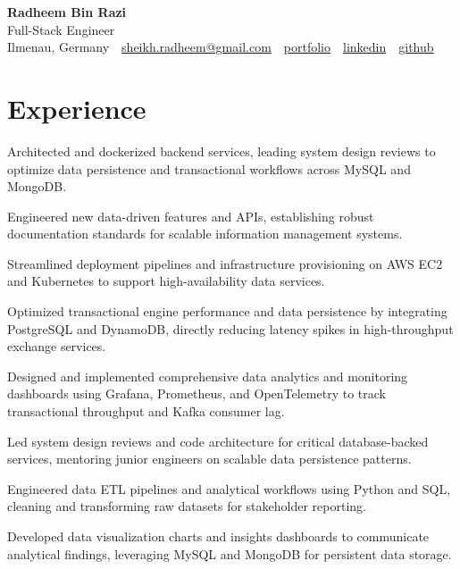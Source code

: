 \documentclass[10pt,a4paper]{resume}
\makeatletter
\newcommand{\Portfolio}{https://radheem.github.io/my-cv}
\newcommand{\PortfolioText}{portfolio}
\newcommand{\GitHub}{https://github.com/radheem}
\newcommand{\LinkedIn}{https://www.linkedin.com/in/radheem-razi}
\newcommand{\Email}{sheikh.radheem@gmail.com}
\makeatother
\begin{document}
\begin{center}
  {\huge\bfseries Radheem Bin Razi}\\[3pt]
  {\large Full-Stack Engineer}\\[6pt]
  \small
  Ilmenau, Germany \,\textbar\,
  \href{mailto:\Email}{\Email} \,\textbar\,
  \href{\Portfolio}{\PortfolioText} \,\textbar\,
  \href{\LinkedIn}{linkedin} \,\textbar\,
  \href{\GitHub}{github}
\end{center}
\vspace{2pt}

\section{Experience}

\bullets
  \item Architected and dockerized backend services, leading system design reviews to optimize data persistence and transactional workflows across MySQL and MongoDB.
  \item Engineered new data-driven features and APIs, establishing robust documentation standards for scalable information management systems.
  \item Streamlined deployment pipelines and infrastructure provisioning on AWS EC2 and Kubernetes to support high-availability data services.
\bulletsend
\vspace{1.5pt}
\bullets
  \item Optimized transactional engine performance and data persistence by integrating PostgreSQL and DynamoDB, directly reducing latency spikes in high-throughput exchange services.
  \item Designed and implemented comprehensive data analytics and monitoring dashboards using Grafana, Prometheus, and OpenTelemetry to track transactional throughput and Kafka consumer lag.
  \item Led system design reviews and code architecture for critical database-backed services, mentoring junior engineers on scalable data persistence patterns.
\bulletsend
\vspace{1.5pt}
\bullets
  \item Engineered data ETL pipelines and analytical workflows using Python and SQL, cleaning and transforming raw datasets for stakeholder reporting.
  \item Developed data visualization charts and insights dashboards to communicate analytical findings, leveraging MySQL and MongoDB for persistent data storage.
\bulletsend
\vspace{1.5pt}
\end{document}
